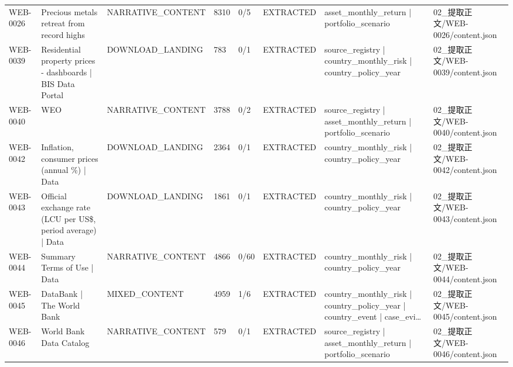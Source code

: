 \begin{landscape}
\begin{longtable}{p{1.8cm}p{4.2cm}p{3.0cm}p{1.4cm}p{1.6cm}p{2.4cm}p{4.2cm}p{4.2cm}}
WEB-0026 & Precious metals retreat from record highs & NARRATIVE\_\allowbreak{}CONTENT & 8310 & 0/\allowbreak{}5 & EXTRACTED & asset\_\allowbreak{}monthly\_\allowbreak{}return | portfolio\_\allowbreak{}scenario & 02\_\allowbreak{}提取正文/\allowbreak{}WEB-0026/\allowbreak{}content.json\\
WEB-0039 & Residential property prices - dashboards | BIS Data Portal & DOWNLOAD\_\allowbreak{}LANDING & 783 & 0/\allowbreak{}1 & EXTRACTED & source\_\allowbreak{}registry | country\_\allowbreak{}monthly\_\allowbreak{}risk | country\_\allowbreak{}policy\_\allowbreak{}year & 02\_\allowbreak{}提取正文/\allowbreak{}WEB-0039/\allowbreak{}content.json\\
WEB-0040 & WEO & NARRATIVE\_\allowbreak{}CONTENT & 3788 & 0/\allowbreak{}2 & EXTRACTED & source\_\allowbreak{}registry | asset\_\allowbreak{}monthly\_\allowbreak{}return | portfolio\_\allowbreak{}scenario & 02\_\allowbreak{}提取正文/\allowbreak{}WEB-0040/\allowbreak{}content.json\\
WEB-0042 & Inflation, consumer prices (annual \%) | Data & DOWNLOAD\_\allowbreak{}LANDING & 2364 & 0/\allowbreak{}1 & EXTRACTED & country\_\allowbreak{}monthly\_\allowbreak{}risk | country\_\allowbreak{}policy\_\allowbreak{}year & 02\_\allowbreak{}提取正文/\allowbreak{}WEB-0042/\allowbreak{}content.json\\
WEB-0043 & Official exchange rate (LCU per US\$, period average) | Data & DOWNLOAD\_\allowbreak{}LANDING & 1861 & 0/\allowbreak{}1 & EXTRACTED & country\_\allowbreak{}monthly\_\allowbreak{}risk | country\_\allowbreak{}policy\_\allowbreak{}year & 02\_\allowbreak{}提取正文/\allowbreak{}WEB-0043/\allowbreak{}content.json\\
WEB-0044 & Summary Terms of Use | Data & NARRATIVE\_\allowbreak{}CONTENT & 4866 & 0/\allowbreak{}60 & EXTRACTED & country\_\allowbreak{}monthly\_\allowbreak{}risk | country\_\allowbreak{}policy\_\allowbreak{}year & 02\_\allowbreak{}提取正文/\allowbreak{}WEB-0044/\allowbreak{}content.json\\
WEB-0045 & DataBank | The World Bank & MIXED\_\allowbreak{}CONTENT & 4959 & 1/\allowbreak{}6 & EXTRACTED & country\_\allowbreak{}monthly\_\allowbreak{}risk | country\_\allowbreak{}policy\_\allowbreak{}year | country\_\allowbreak{}event | case\_\allowbreak{}evi… & 02\_\allowbreak{}提取正文/\allowbreak{}WEB-0045/\allowbreak{}content.json\\
WEB-0046 & World Bank Data Catalog & NARRATIVE\_\allowbreak{}CONTENT & 579 & 0/\allowbreak{}1 & EXTRACTED & source\_\allowbreak{}registry | asset\_\allowbreak{}monthly\_\allowbreak{}return | portfolio\_\allowbreak{}scenario & 02\_\allowbreak{}提取正文/\allowbreak{}WEB-0046/\allowbreak{}content.json\\

\end{longtable}
\end{landscape}
